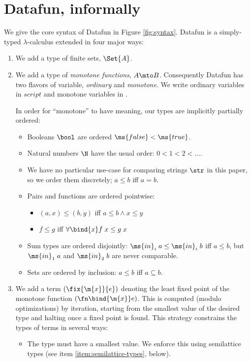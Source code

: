 
\section{Datafun, informally}
\label{sec:informally}

We give the core syntax of Datafun in Figure \ref{fig:syntax}. Datafun is a
simply-typed $\lambda$-calculus extended in four major ways:

\begin{enumerate}
\item We add a type of finite sets, $\Set{A}$.



\item We add a type of \emph{monotone functions}, $A \mto B$. Consequently
  Datafun has two flavors of variable, \emph{ordinary} and \emph{monotone}. We
  write ordinary variables in $script$ and monotone variables in .

  In order for ``monotone'' to have meaning, our types are implicitly partially
  ordered:
  \begin{itemize}
  \item Booleans $\bool$ are ordered $\ms{false} < \ms{true}$.
  \item Natural numbers $\N$ have the usual order: $0 < 1 < 2 < ...$.
  \item We have no particular use-case for comparing strings $\str$ in
    this paper, so we order them discretely; $a \le b$ iff $a = b$.
  \item Pairs and functions are ordered pointwise:
    \begin{itemize}
    \item $(a, x) \le (b, y)$ iff $a \le b \wedge x \le y$
    \item $f \le g$ iff $\forall \bind{x} f\;x \le g\;x$
    \end{itemize}
  \item Sum types are ordered disjointly: $\ms{in}_i\; a \le
    \ms{in}_i\; b$ iff $a \le b$, but $\ms{in}_1\; a$ and $\ms{in}_2\; b$ are
    never comparable.
  \item Sets are ordered by inclusion: $a \le b$ iff $a \subseteq b$.
  \end{itemize}

\item We add a term $(\fix{\m{x}}{e})$ denoting the least fixed point of the
  monotone function $(\fn\bind{\m{x}} e)$. This is computed (modulo
  optimizations) by iteration, starting from the smallest value of the desired
  type and halting once a fixed point is found. This strategy constrains the
  types of  terms in several ways:
  \begin{itemize}
  \item The type must have a smallest value. We enforce this using semilattice
    types (see item \ref{item:semilattice-types}, below).


\end{itemize}
\end{enumerate}
